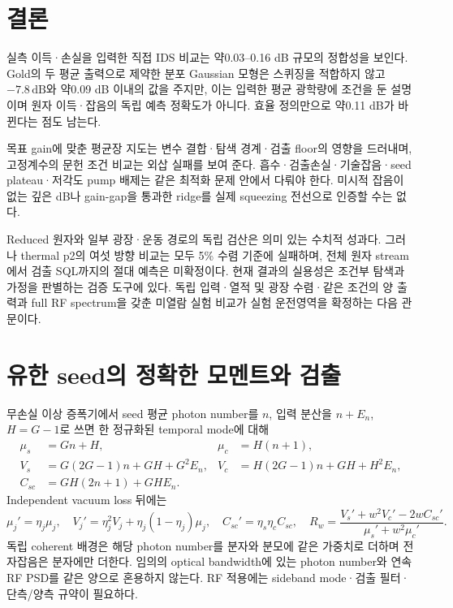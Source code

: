 \documentclass[11pt,a4paper]{article}
\newcommand{\dB}{\,\mathrm{dB}}
\begin{document}
\section{결론}
실측 이득·손실을 입력한 직접 IDS 비교는 약0.03--0.16 dB 규모의
정합성을 보인다. Gold의 두 평균 출력으로 제약한 분포 Gaussian 모형은
스퀴징을 적합하지 않고 $-7.8\dB$와 약0.09 dB 이내의 값을 주지만,
이는 입력한 평균 광학량에 조건을 둔 설명이며 원자 이득·잡음의 독립
예측 정확도가 아니다. 효율 정의만으로 약0.11 dB가 바뀐다는 점도 남는다.

목표 gain에 맞춘 평균장 지도는 변수 결합·탐색 경계·검출 floor의
영향을 드러내며, 고정계수의 문헌 조건 비교는 외삽 실패를 보여 준다.
흡수·검출손실·기술잡음·seed plateau·저각도 pump 배제는 같은 최적화
문제 안에서 다뤄야 한다. 미시적 잡음이 없는 깊은 dB나 gain-gap을
통과한 ridge를 실제 squeezing 전선으로 인증할 수는 없다.

Reduced 원자와 일부 광장·운동 경로의 독립 검산은 의미 있는 수치적
성과다. 그러나 thermal p2의 여섯 방향 비교는 모두 5\% 수렴 기준에
실패하며, 전체 원자 stream에서 검출 SQL까지의 절대 예측은 미확정이다.
현재 결과의 실용성은 조건부 탐색과 가정을 판별하는 검증 도구에 있다.
독립 입력·열적 및 광장 수렴·같은 조건의 양 출력과 full RF spectrum을
갖춘 미열람 실험 비교가 실험 운전영역을 확정하는 다음 관문이다.

\appendix

\section{유한 seed의 정확한 모멘트와 검출}
무손실 이상 증폭기에서 seed 평균 photon number를 $n$, 입력 분산을
$n+E_n$, $H=G-1$로 쓰면 한 정규화된 temporal mode에 대해
\begin{align}
 \mu_s&=Gn+H,&\mu_c&=H(n+1),\\
 V_s&=G(2G-1)n+GH+G^2E_n,&
 V_c&=H(2G-1)n+GH+H^2E_n,\\
 C_{sc}&=GH(2n+1)+GHE_n.
\end{align}
Independent vacuum loss 뒤에는
\begin{equation}
 \mu_j'=\eta_j\mu_j,\quad
 V_j'=\eta_j^2V_j+\eta_j(1-\eta_j)\mu_j,\quad
 C_{sc}'=\eta_s\eta_c C_{sc},\quad
 R_w=\frac{V_s'+w^2V_c'-2wC_{sc}'}{\mu_s'+w^2\mu_c'}.
\end{equation}
독립 coherent 배경은 해당 photon number를 분자와 분모에 같은 가중치로
더하며 전자잡음은 분자에만 더한다. 임의의 optical bandwidth에 있는
photon number와 연속 RF PSD를 같은 양으로 혼용하지 않는다.
RF 적용에는 sideband mode·검출 필터·단측/양측 규약이 필요하다.
\end{document}

